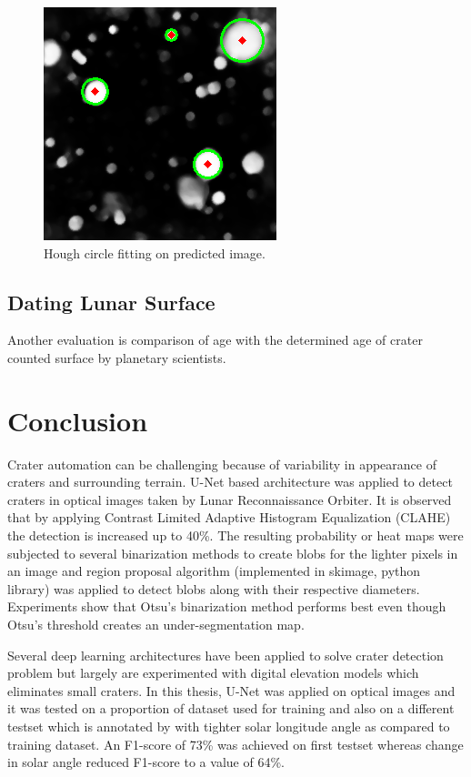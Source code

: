 \documentclass[11pt]{article}
\begin{document}
\begin{figure}[H]
	\centering
	\includegraphics[width=.4\textwidth]{files/results/hough.png}
	\caption{Hough circle fitting on predicted image.}
	\label{hough}
\end{figure}

\subsection{Dating Lunar Surface}
Another evaluation is comparison of age with the determined age of crater counted surface by planetary scientists.

\section{Conclusion}
Crater automation can be challenging because of variability in appearance of craters and surrounding terrain. U-Net based architecture was applied to detect craters in optical images taken by Lunar Reconnaissance Orbiter. It is observed that by applying Contrast Limited Adaptive Histogram Equalization (CLAHE) the detection is increased up to 40\%. The resulting probability or heat maps were subjected to several binarization methods to create blobs for the lighter pixels in an image and region proposal algorithm (implemented in skimage, python library) was applied to detect blobs along with their respective diameters. Experiments show that Otsu's binarization method performs best even though Otsu's threshold creates an under-segmentation map. 

Several deep learning architectures have been applied to solve crater detection problem but largely are experimented with digital elevation models which eliminates small craters. In this thesis, U-Net was applied on optical images and it was tested on a proportion of dataset used for training and also on a different testset which is annotated by \cite{dino2020} with tighter solar longitude angle as compared to training dataset. An F1-score of 73\% was achieved on first testset whereas change in solar angle reduced F1-score to a value of 64\%.
\end{document}
